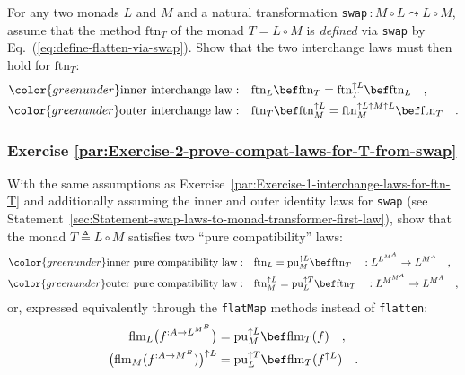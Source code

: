 For any two monads $L$ and $M$ and a natural transformation \lstinline!swap!$\,:M\circ L\leadsto L\circ M$,
assume that the method $\text{ftn}_{T}$ of the monad $T=L\circ M$
is \emph{defined} via \lstinline!swap! by Eq.~(\ref{eq:define-flatten-via-swap}).
Show that the two interchange laws must then hold for $\text{ftn}_{T}$:
\begin{align*}
{\color{greenunder}\text{inner interchange law}:}\quad & \text{ftn}_{L}\bef\text{ftn}_{T}=\text{ftn}_{T}^{\uparrow L}\bef\text{ftn}_{L}\quad,\\
{\color{greenunder}\text{outer interchange law}:}\quad & \text{ftn}_{T}\bef\text{ftn}_{M}^{\uparrow L}=\text{ftn}_{M}^{\uparrow L\uparrow M\uparrow L}\bef\text{ftn}_{T}\quad.
\end{align*}


\subsubsection{Exercise \label{par:Exercise-2-prove-compat-laws-for-T-from-swap}\ref{par:Exercise-2-prove-compat-laws-for-T-from-swap}}

With the same assumptions as Exercise~\ref{par:Exercise-1-interchange-laws-for-ftn-T}
and additionally assuming the inner and outer identity laws for \lstinline!swap!
(see Statement~\ref{sec:Statement-swap-laws-to-monad-transformer-first-law}),
show that the monad $T\triangleq L\circ M$ satisfies two \textsf{``}pure
compatibility\textsf{''} laws:
\begin{align*}
{\color{greenunder}\text{inner pure compatibility law}:}\quad & \text{ftn}_{L}=\text{pu}_{M}^{\uparrow L}\bef\text{ftn}_{T}\quad:L^{L^{M^{A}}}\rightarrow L^{M^{A}}\quad,\\
{\color{greenunder}\text{outer pure compatibility law}:}\quad & \text{ftn}_{M}^{\uparrow L}=\text{pu}_{L}^{\uparrow T}\bef\text{ftn}_{T}\quad:L^{M^{M^{A}}}\rightarrow L^{M^{A}}\quad,
\end{align*}
or, expressed equivalently through the \lstinline!flatMap! methods
instead of \lstinline!flatten!:
\begin{align*}
\text{flm}_{L}\big(f^{:A\rightarrow L^{M^{B}}}\big) & =\text{pu}_{M}^{\uparrow L}\bef\text{flm}_{T}(f)\quad,\\
\big(\text{flm}_{M}(f^{:A\rightarrow M^{B}})\big)^{\uparrow L} & =\text{pu}_{L}^{\uparrow T}\bef\text{flm}_{T}(f^{\uparrow L})\quad.
\end{align*}


